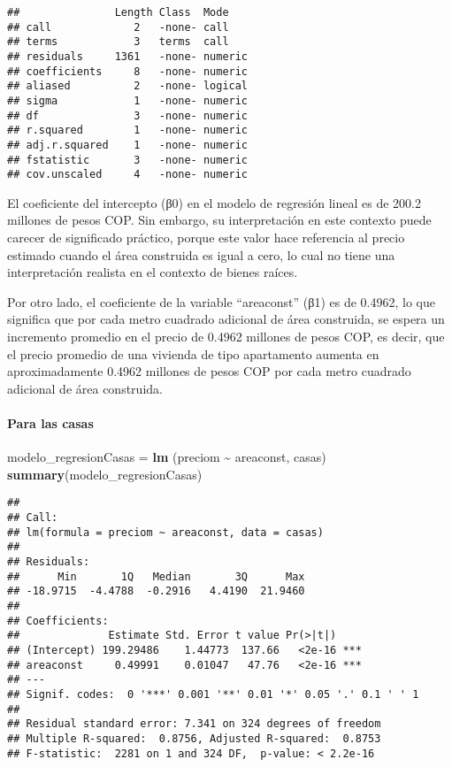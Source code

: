\documentclass[
]{article}
\newenvironment{Shaded}{\begin{snugshade}}{\end{snugshade}}
\newcommand{\FunctionTok}[1]{\textcolor[rgb]{0.13,0.29,0.53}{\textbf{#1}}}
\newcommand{\NormalTok}[1]{#1}
\newcommand{\OtherTok}[1]{\textcolor[rgb]{0.56,0.35,0.01}{#1}}
\newcommand{\SpecialCharTok}[1]{\textcolor[rgb]{0.81,0.36,0.00}{\textbf{#1}}}
\begin{document}
\begin{verbatim}
##               Length Class  Mode   
## call             2   -none- call   
## terms            3   terms  call   
## residuals     1361   -none- numeric
## coefficients     8   -none- numeric
## aliased          2   -none- logical
## sigma            1   -none- numeric
## df               3   -none- numeric
## r.squared        1   -none- numeric
## adj.r.squared    1   -none- numeric
## fstatistic       3   -none- numeric
## cov.unscaled     4   -none- numeric
\end{verbatim}

El coeficiente del intercepto (β0) en el modelo de regresión lineal es
de 200.2 millones de pesos COP. Sin embargo, su interpretación en este
contexto puede carecer de significado práctico, porque este valor hace
referencia al precio estimado cuando el área construida es igual a cero,
lo cual no tiene una interpretación realista en el contexto de bienes
raíces.

Por otro lado, el coeficiente de la variable ``areaconst'' (β1) es de
0.4962, lo que significa que por cada metro cuadrado adicional de área
construida, se espera un incremento promedio en el precio de 0.4962
millones de pesos COP, es decir, que el precio promedio de una vivienda
de tipo apartamento aumenta en aproximadamente 0.4962 millones de pesos
COP por cada metro cuadrado adicional de área construida.

\paragraph{\texorpdfstring{\textbf{Para las
casas}}{Para las casas}}\label{para-las-casas}

\begin{Shaded}
\begin{Highlighting}[]
\NormalTok{modelo\_regresionCasas }\OtherTok{=} \FunctionTok{lm}\NormalTok{ (preciom }\SpecialCharTok{\textasciitilde{}}\NormalTok{ areaconst, casas)}
\FunctionTok{summary}\NormalTok{(modelo\_regresionCasas)}
\end{Highlighting}
\end{Shaded}

\begin{verbatim}
## 
## Call:
## lm(formula = preciom ~ areaconst, data = casas)
## 
## Residuals:
##      Min       1Q   Median       3Q      Max 
## -18.9715  -4.4788  -0.2916   4.4190  21.9460 
## 
## Coefficients:
##              Estimate Std. Error t value Pr(>|t|)    
## (Intercept) 199.29486    1.44773  137.66   <2e-16 ***
## areaconst     0.49991    0.01047   47.76   <2e-16 ***
## ---
## Signif. codes:  0 '***' 0.001 '**' 0.01 '*' 0.05 '.' 0.1 ' ' 1
## 
## Residual standard error: 7.341 on 324 degrees of freedom
## Multiple R-squared:  0.8756, Adjusted R-squared:  0.8753 
## F-statistic:  2281 on 1 and 324 DF,  p-value: < 2.2e-16
\end{verbatim}
\end{document}
